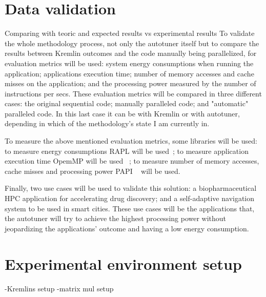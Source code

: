 \section{Data validation}
Comparing with teoric and expected results vs experimental results
To validate the whole methodology process, not only the autotuner itself but to compare the results between Kremlin outcomes and the code manually being parallelized, for evaluation metrics will be used: system energy consumptions when running the application; applications execution time; number of memory accesses and cache misses on the application; and the processing power measured by the number of instructions per secs. These evaluation metrics will be compared in three different cases: the original sequential code; manually paralleled code; and "automatic" paralleled code. In this last case it can be with Kremlin or with autotuner, depending in which of the methodology's state I am currently in.

To measure the above mentioned evaluation metrics, some libraries will be used: to measure energy consumptions RAPL will be used~\cite{Marcus}; to measure application  execution time OpemMP will be used ~\cite{Nc1998}; to measure number of memory accesses, cache misses and processing power PAPI ~\cite{Marcus} will be used.

Finally, two use cases will be used to validate this solution: a biopharmaceutical HPC application for accelerating drug discovery; and a self-adaptive navigation system to be used in smart cities. These use cases will be the applications that, the autotuner will try to achieve the highest processing power without jeopardizing the applications' outcome and having a low energy consumption.

\section{Experimental environment setup}

-Kremlins setup
-matrix mul setup
